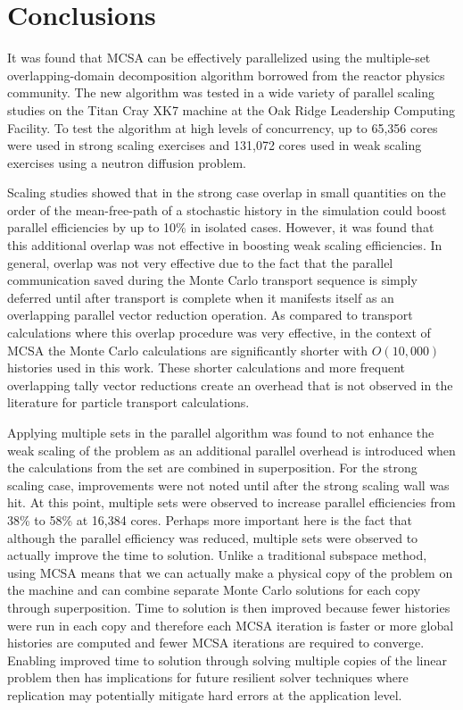 \documentclass{snamc2013}
\begin{document}
\section{Conclusions}

It was found that MCSA can be effectively parallelized using the
multiple-set overlapping-domain decomposition algorithm borrowed from
the reactor physics community.  The new algorithm was tested in a wide
variety of parallel scaling studies on the Titan Cray XK7 machine at
the Oak Ridge Leadership Computing Facility. To test the algorithm at
high levels of concurrency, up to 65,356 cores were used in strong
scaling exercises and 131,072 cores used in weak scaling exercises
using a neutron diffusion problem.

Scaling studies showed that in the strong case overlap in small
quantities on the order of the mean-free-path of a stochastic history
in the simulation could boost parallel efficiencies by up to 10\% in
isolated cases. However, it was found that this additional overlap was
not effective in boosting weak scaling efficiencies. In general,
overlap was not very effective due to the fact that the parallel
communication saved during the Monte Carlo transport sequence is
simply deferred until after transport is complete when it manifests
itself as an overlapping parallel vector reduction operation. As
compared to transport calculations where this overlap procedure was
very effective, in the context of MCSA the Monte Carlo calculations
are significantly shorter with $O(10,000)$ histories used in this
work. These shorter calculations and more frequent overlapping tally
vector reductions create an overhead that is not observed in the
literature for particle transport calculations.

Applying multiple sets in the parallel algorithm was found to not
enhance the weak scaling of the problem as an additional parallel
overhead is introduced when the calculations from the set are combined
in superposition. For the strong scaling case, improvements were not
noted until after the strong scaling wall was hit. At this point,
multiple sets were observed to increase parallel efficiencies from
38\% to 58\% at 16,384 cores. Perhaps more important here is the fact
that although the parallel efficiency was reduced, multiple sets were
observed to actually improve the time to solution. Unlike a
traditional subspace method, using MCSA means that we can actually
make a physical copy of the problem on the machine and can combine
separate Monte Carlo solutions for each copy through
superposition. Time to solution is then improved because fewer
histories were run in each copy and therefore each MCSA iteration is
faster or more global histories are computed and fewer MCSA iterations
are required to converge. Enabling improved time to solution through
solving multiple copies of the linear problem then has implications
for future resilient solver techniques where replication may
potentially mitigate hard errors at the application level.
\end{document}
